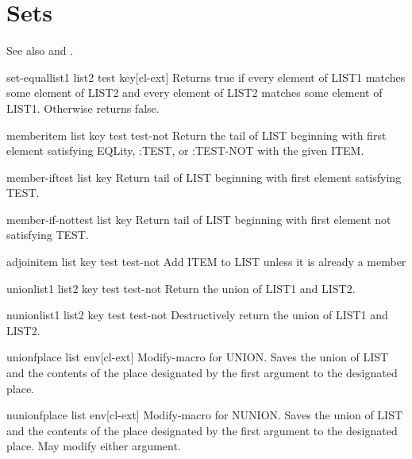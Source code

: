 \documentclass[10pt,english]{book}
\begin{document}
\section{Sets}
\label{sec:sets}

See also  and .

\begin{function}{set-equal}{list1 list2 \key test key}[cl-ext]
  Returns true if every element of LIST1 matches some element of LIST2 and
every element of LIST2 matches some element of LIST1. Otherwise returns false.
\end{function}

\begin{function}{member}{item list \key key test test-not}
  Return the tail of LIST beginning with first element satisfying EQLity,
   :TEST, or :TEST-NOT with the given ITEM.
\end{function}

\begin{function}{member-if}{test list \key key}
  Return tail of LIST beginning with first element satisfying TEST.
\end{function}

\begin{function}{member-if-not}{test list \key key}
  Return tail of LIST beginning with first element not satisfying TEST.
\end{function}

\begin{function}{adjoin}{item list \key key test test-not}
  Add ITEM to LIST unless it is already a member
\end{function}

\begin{function}{union}{list1 list2 \key key test test-not}
  Return the union of LIST1 and LIST2.
\end{function}

\begin{function}{nunion}{list1 list2 \key key test test-not}
  Destructively return the union of LIST1 and LIST2.
\end{function}

\begin{macro}{unionf}{place list \env env}[cl-ext]
  Modify-macro for UNION. Saves the union of LIST and the contents of the
place designated by the first argument to the designated place.
\end{macro}

\begin{macro}{nunionf}{place list \env env}[cl-ext]
  Modify-macro for NUNION. Saves the union of LIST and the contents of the
place designated by the first argument to the designated place. May modify
either argument.
\end{macro}
\end{document}
